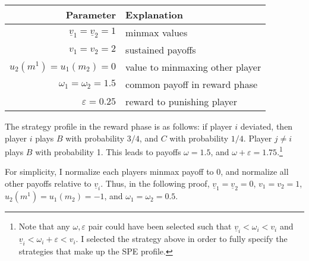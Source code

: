 \documentclass[11pt]{article}
\begin{document}
\begin{enumerate}
\begin{enumerate}
		\begin{table*}[!ht]
			\centering
			\begin{tabular}{r|l} 
				Parameter & Explanation \\ \hline 
				$ \underline{v}_1 = \underline{v}_2 = 1 $ & minmax values\\
				$ v_1 = v_2 = 2 $ & sustained payoffs\\
				$ u_2(m^1) = u_1(m_2) = 0 $ & value to minmaxing other player \\
				$ \omega_1 = \omega_2 = 1.5 $ & common payoff in reward phase\\
				$ \varepsilon = 0.25 $ & reward to punishing player \\
			\end{tabular}
		\end{table*}
		The strategy profile in the reward phase is as follows: if player $ i $ deviated, then player $ i $ plays $ B $ with probability $ 3/4 $, and $ C $ with probability $ 1/4 $. Player $ j\neq i $ plays $ B $ with probability 1. This leads to payoffs $ \omega = 1.5 $, and $ \omega + \varepsilon = 1.75 $.\footnote{Note that any $ \omega,\varepsilon $ pair could have been selected such that $ \underline{v}_i < \omega_i < v_i $ and $ \underline{v}_i < \omega_i + \varepsilon < v_i $. I selected the strategy above in order to fully specify the strategies that make up the SPE profile.}
		
		For simplicity, I normalize each players minmax payoff to 0, and normalize all other payoffs relative to $ \underline{v}_i $. Thus, in the following proof, $ \underline{v}_1 = \underline{v}_2 = 0 $, $ v_1 = v_2 = 1 $, $ u_2(m^1) = u_1(m_2) = -1 $, and $ \omega_1 = \omega_2 = 0.5 $. 
		
	\end{enumerate}
	

\end{enumerate}
\end{document}
